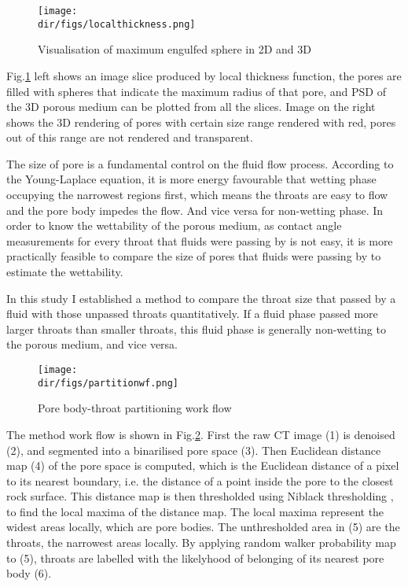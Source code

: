 \begin{figure}[htbp]
  \centering
  \texttt{[image: \\dir/figs/localthickness.png]}
  \caption{Visualisation of maximum engulfed sphere in 2D and 3D}
  \label{localthickness}
\end{figure}

Fig.\ref{localthickness} left shows an image slice produced by local thickness function, the pores are filled with spheres that indicate the maximum radius of that pore, and PSD of the 3D porous medium can be plotted from all the slices. Image on the right shows the 3D rendering of pores with certain size range rendered with red, pores out of this range are not rendered and transparent.

The size of pore is a fundamental control on the fluid flow process. According to the Young-Laplace equation, it is more energy favourable that wetting phase occupying the narrowest regions first, which means the throats are easy to flow and the pore body impedes the flow. And vice versa for non-wetting phase. In order to know the wettability of the porous medium, as contact angle measurements for every throat that fluids were passing by is not easy, it is more practically feasible to compare the size of pores that fluids were passing by to estimate the wettability.

In this study I established a method to compare the throat size that passed by a fluid with those unpassed throats quantitatively. If a fluid phase passed more larger throats than smaller throats, this fluid phase is generally non-wetting to the porous medium, and vice versa.

\begin{figure}[htbp]
  \centering
  \texttt{[image: \\dir/figs/partitionwf.png]}
  \caption{Pore body-throat partitioning work flow}
  \label{partitionwf}
\end{figure}

The method work flow is shown in Fig.\ref{partitionwf}. First the raw CT image (1) is denoised (2), and segmented into a binarilised pore space (3). Then Euclidean distance map (4) of the pore space is computed, which is the Euclidean distance of a pixel to its nearest boundary, i.e. the distance of a point inside the pore to the closest rock surface. This distance map is then thresholded using Niblack thresholding \citep{niblack1985introduction}, to find the local maxima of the distance map. The local maxima represent the widest areas locally, which are pore bodies. The unthresholded area in (5) are the throats, the narrowest areas locally. By applying random walker probability map to (5), throats are labelled with the likelyhood of belonging of its nearest pore body (6). 

